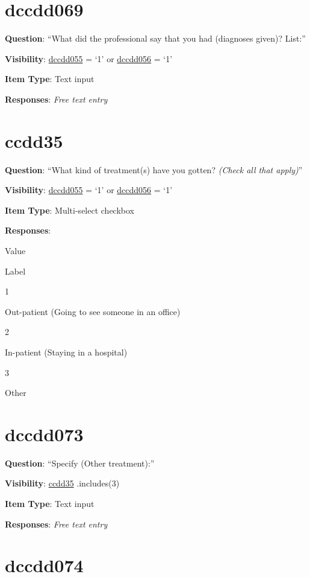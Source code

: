 \documentclass[]{book}
\begin{document}
\hypertarget{dccdd069}{%
\section{dccdd069}\label{dccdd069}}

\textbf{Question}: ``What did the professional say that you had (diagnoses given)? List:''

\textbf{Visibility}: \protect\hyperlink{dccdd055}{dccdd055} = `1' or \protect\hyperlink{dccdd056}{dccdd056} = `1'

\textbf{Item Type}: Text input

\textbf{Responses}: \emph{Free text entry}

\hypertarget{ccdd35}{%
\section{ccdd35}\label{ccdd35}}

\textbf{Question}: ``What kind of treatment(s) have you gotten? \emph{(Check all that apply)}''

\textbf{Visibility}: \protect\hyperlink{dccdd055}{dccdd055} = `1' or \protect\hyperlink{dccdd056}{dccdd056} = `1'

\textbf{Item Type}: Multi-select checkbox

\textbf{Responses}:

Value

Label

1

Out-patient (Going to see someone in an office)

2

In-patient (Staying in a hospital)

3

Other

\hypertarget{dccdd073}{%
\section{dccdd073}\label{dccdd073}}

\textbf{Question}: ``Specify (Other treatment):''

\textbf{Visibility}: \protect\hyperlink{ccdd35}{ccdd35} .includes(3)

\textbf{Item Type}: Text input

\textbf{Responses}: \emph{Free text entry}

\hypertarget{dccdd074}{%
\section{dccdd074}\label{dccdd074}}
\end{document}
